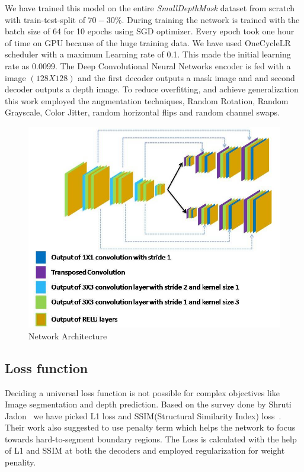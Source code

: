 \documentclass[review]{cvpr}
\begin{document}
We have trained this model on the entire \textit{SmallDepthMask} dataset from scratch with train-test-split of $70-30\%$. 
During training the network is trained with the batch size of 64 for 10 epochs using SGD optimizer\cite{bottou2010large}. Every epoch took one hour of time on GPU because of the huge training data.
We have used OneCycleLR scheduler \cite{smith2018disciplined} with a maximum Learning rate of 0.1. 
This made the initial learning rate as 0.0099.
The Deep Convolutional Neural Networks encoder is fed with a image $(128 X 128)$ and the first decoder outputs a mask 
image and and second decoder outputs a depth image. To reduce overfitting\cite{perez2017effectiveness}, and achieve generalization
this work employed the augmentation techniques, Random Rotation, Random Grayscale, Color Jitter, random horizontal flips and random channel swaps. 

\begin{figure}
\centering
  \includegraphics[width=1.0\linewidth]{networkarchitecture.jpg}
  \caption{Network Architecture}
  \label{fig:modelarch}
\end{figure}

\subsection{Loss function}
Deciding a universal loss function is not possible for complex objectives like Image segmentation and depth prediction. Based on the survey done by Shruti Jadon~\cite{jadon2020survey} we have picked L1 loss and SSIM(Structural Similarity Index) loss~\cite{zhao2015loss}. Their work also suggested to use penalty term which helps the network to focus towards hard-to-segment boundary regions. The Loss is calculated with the help of L1 and SSIM at both the decoders and employed regularization for weight penality.
\end{document}
